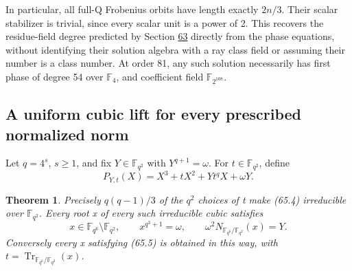\documentclass[11pt,reqno]{amsart}
\theoremstyle{plain}
\newtheorem{theorem}{Theorem}[section]
\begin{document}
In particular, all full-Q Frobenius orbits have length exactly
\(2n/3\). Their scalar stabilizer is trivial, since every scalar
unit is a power of 2. This recovers the residue-field degree predicted
by Section \hyperref[sec:63]{63} directly from the phase equations, without identifying
their solution algebra with a ray class field or assuming their
number is a class number. At order 81, any such solution necessarily
has first phase of degree 54 over \(\mathbb F_4\), and coefficient
field \(\mathbb F_{2^{108}}\).

\subsection{A uniform cubic lift for every prescribed normalized norm}\label{sec:65.3}

Let \(q=4^s\), \(s\ge1\), and fix
\(Y\in\mathbb F_{q^2}\) with \(Y^{q+1}=\omega\). For
\(t\in\mathbb F_{q^2}\), define
\begin{equation*}
 \boxed{P_{Y,t}(X)=X^3+tX^2+Yt^qX+\omega Y.}
 \tag{65.4}
\end{equation*}

\begin{theorem}
Precisely \(q(q-1)/3\) of the \(q^2\) choices of t
make (65.4) irreducible over \(\mathbb F_{q^2}\). Every root x
of every such irreducible cubic satisfies
\begin{equation*}
 x\in\mathbb F_{q^6}\setminus\mathbb F_{q^2},\qquad
 x^{q^3+1}=\omega,\qquad
 \omega^2N_{\mathbb F_{q^6}/\mathbb F_{q^2}}(x)=Y.
 \tag{65.5}
\end{equation*}
Conversely every x satisfying (65.5) is obtained in this way, with
\(t=\operatorname{Tr}_{\mathbb F_{q^6}/\mathbb F_{q^2}}(x)\).
\end{theorem}
\end{document}
